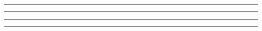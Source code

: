 
\begin{problem}{9.4}

\end{problem}

\begin{solution}


\end{solution}

\noindent\rule{7in}{1.5pt}


\begin{problem}{9.5}

\end{problem}

\begin{solution}


\end{solution}

\noindent\rule{7in}{1.5pt}


\begin{problem}{9.6}

\end{problem}

\begin{solution}


\end{solution}

\noindent\rule{7in}{1.5pt}


\begin{problem}{9.7}

\end{problem}

\begin{solution}


\end{solution}

\noindent\rule{7in}{1.5pt}


